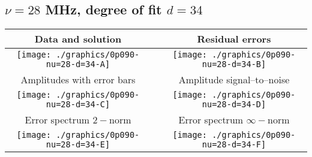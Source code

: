 

% 

\clearpage{}
\break{}

\subsection{$\nu = 28$ MHz, degree of fit $d = 34$}

\begin{table}[h]
    \begin{center}
        \begin{tabular}{ccc}
            Data and solution & \quad & Residual errors \\\hline
            \texttt{[image: ./graphics/0p090-nu=28-d=34-A]} &&
            \texttt{[image: ./graphics/0p090-nu=28-d=34-B]} \\[15pt]
            Amplitudes with error bars && Amplitude signal--to--noise \\\hline
            \texttt{[image: ./graphics/0p090-nu=28-d=34-C]} &&
            \texttt{[image: ./graphics/0p090-nu=28-d=34-D]} \\[15pt]
            Error spectrum $2-$norm && Error spectrum $\infty-$norm \\\hline
            \texttt{[image: ./graphics/0p090-nu=28-d=34-E]} &&
            \texttt{[image: ./graphics/0p090-nu=28-d=34-F]} \\[15pt]
        \end{tabular}
    \end{center}
\label{fig:elev=90, nu=28}
\end{table}



\endinput
